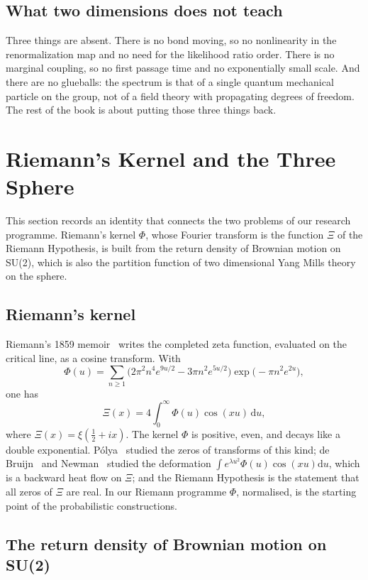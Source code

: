 \subsection{What two dimensions does not teach}

Three things are absent. There is no bond moving, so no nonlinearity in the renormalization map and no need for the likelihood ratio order. There is no marginal coupling, so no first passage time and no exponentially small scale. And there are no glueballs: the spectrum is that of a single quantum mechanical particle on the group, not of a field theory with propagating degrees of freedom. The rest of the book is about putting those three things back.

\section{Riemann's Kernel and the Three Sphere}\label{ch:riemann}

This section records an identity that connects the two problems of our research programme. Riemann's kernel $\Phi$, whose Fourier transform is the function $\Xi$ of the Riemann Hypothesis, is built from the return density of Brownian motion on SU(2), which is also the partition function of two dimensional Yang Mills theory on the sphere.

\subsection{Riemann's kernel}

Riemann's 1859 memoir~\cite{Ri59} writes the completed zeta function, evaluated on the critical line, as a cosine transform. With
\[
\Phi(u)=\sum_{n\ge1}\big(2\pi^2n^4e^{9u/2}-3\pi n^2e^{5u/2}\big)\exp\big(-\pi n^2e^{2u}\big),
\]
one has
\[
\Xi(x)=4\int_0^\infty\Phi(u)\cos(xu)\,\mathrm du,
\]
where $\Xi(x)=\xi(\tfrac12+ix)$. The kernel $\Phi$ is positive, even, and decays like a double exponential. P\'olya~\cite{Po26} studied the zeros of transforms of this kind; de Bruijn~\cite{dB50} and Newman~\cite{Ne76} studied the deformation $\int e^{\lambda u^2}\Phi(u)\cos(xu)\mathrm du$, which is a backward heat flow on $\Xi$; and the Riemann Hypothesis is the statement that all zeros of $\Xi$ are real. In our Riemann programme $\Phi$, normalised, is the starting point of the probabilistic constructions.

\subsection{The return density of Brownian motion on SU(2)}

